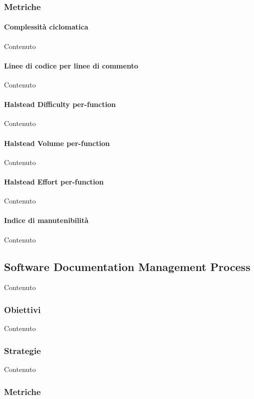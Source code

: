     \subsubsection{Metriche}

    \paragraph{Complessit\`a ciclomatica}
    Contenuto

    \paragraph{Linee di codice per linee di commento}
    Contenuto

    \paragraph{Halstead Difficulty per-function}
    Contenuto

    \paragraph{Halstead Volume per-function}
    Contenuto

    \paragraph{Halstead Effort per-function}
    Contenuto

    \paragraph{Indice di manutenibilit\`a}
    Contenuto


    \subsection{Software Documentation Management Process}
    Contenuto

    \subsubsection{Obiettivi}
    Contenuto

    \subsubsection{Strategie}
    Contenuto


    \subsubsection{Metriche}

